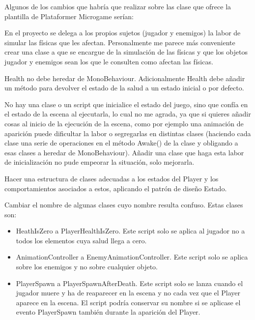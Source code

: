 Algunos de los cambios que habría que realizar sobre las clase que ofrece la plantilla de Plataformer Microgame serían:

En el proyecto se delega a los propios sujetos (jugador y enemigos) la labor de simular las físicas que les afectan. Personalmente me parece más conveniente crear una clase a que se encargue de la simulación de las físicas y que los objetos jugador y enemigos sean los que le consulten como afectan las físicas. 

Health no debe heredar de MonoBehaviour. Adicionalmente Health debe añadir un método para devolver el estado de la salud a un estado inicial o por defecto. 

No hay una clase o un script que inicialice el estado del juego, sino que confía en el estado de la escena al ejecutarla, lo cual no me agrada, ya que si quieres añadir cosas al inicio de la ejecución de la escena, como por ejemplo una animación de aparición puede dificultar la labor o segregarlas en distintas clases (haciendo cada clase una serie de operaciones en el método Awake() de la clase y obligando a esas clases a heredar de MonoBehaviour). Añadir una clase que haga esta labor de inicialización no pude empeorar la situación, solo mejorarla. 

Hacer una estructura de clases adecuadas a los estados del Player y los comportamientos asociados a estos, aplicando el patrón de diseño Estado. 

Cambiar el nombre de algunas clases cuyo nombre resulta confuso. Estas clases son: 
\begin{itemize}
\item
HeathIsZero a PlayerHealthIsZero. Este script solo se aplica al jugador no a todos los elementos cuya salud llega a cero. 
\item
AnimationController a EnemyAnimationController. Este script solo se aplica sobre los enemigos y no sobre cualquier objeto. 
\item
PlayerSpawn a PlayerSpawnAfterDeath. Este script solo se lanza cuando el jugador muere y ha de reaparecer en la escena y no cada vez que el Player aparece en la escena. El script podría conservar su nombre si se aplicase el evento PlayerSpawn también durante la aparición del Player.
\end{itemize}

